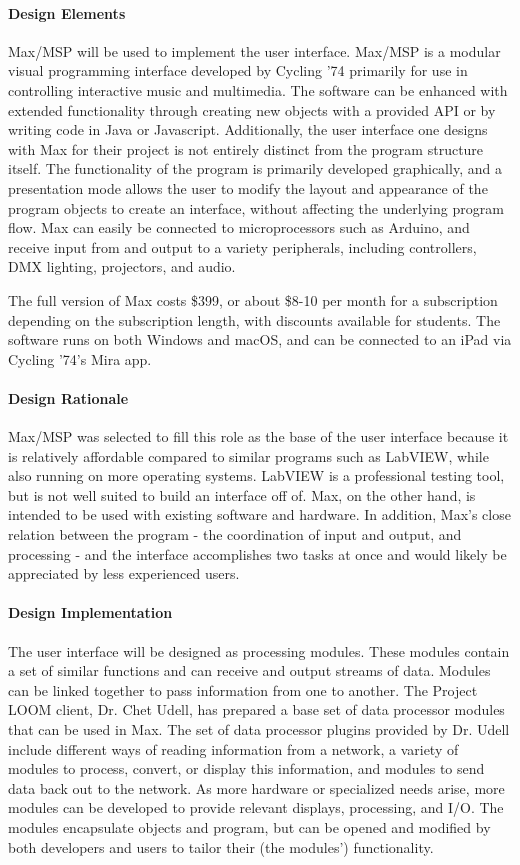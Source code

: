 \documentclass[onecolumn, draftclsnofoot,10pt, compsoc]{IEEEtran}
\begin{document}
\paragraph{Design Elements}
    Max/MSP will be used to implement the user interface. Max/MSP is a modular visual programming interface developed by Cycling '74 primarily for use in controlling interactive music and multimedia. The software can be enhanced with extended functionality through creating new objects with a provided API or by writing code in Java or Javascript. Additionally, the user interface one designs with Max for their project is not entirely distinct from the program structure itself. The functionality of the program is primarily developed graphically, and a presentation mode allows the user to modify the layout and appearance of the program objects to create an interface, without affecting the underlying program flow. Max can easily be connected to microprocessors such as Arduino, and receive input from and output to a variety peripherals, including controllers, DMX lighting, projectors, and audio. \cite{max}

    The full version of Max costs \$399, or about \$8-10 per month for a subscription depending on the subscription length, with discounts available for students. The software runs on both Windows and macOS, and can be connected to an iPad via Cycling '74's Mira app. \cite{buymax}

\paragraph{Design Rationale}
    Max/MSP was selected to fill this role as the base of the user interface because it is relatively affordable compared to similar programs such as LabVIEW, while also running on more operating systems. LabVIEW is a professional testing tool, but is not well suited to build an interface off of. Max, on the other hand, is intended to be used with existing software and hardware. In addition, Max's close relation between the program - the coordination of input and output, and processing - and the interface accomplishes two tasks at once and would likely be appreciated by less experienced users.

\paragraph{Design Implementation}
    The user interface will be designed as processing modules. These modules contain a set of similar functions and can receive and output streams of data. Modules can be linked together to pass information from one to another. The Project LOOM client, Dr. Chet Udell, has prepared a base set of data processor modules that can be used in Max. The set of data processor plugins provided by Dr. Udell include different ways of reading information from a network, a variety of modules to process, convert, or display this information, and modules to send data back out to the network. As more hardware or specialized needs arise, more modules can be developed to provide relevant displays, processing, and I/O. The modules encapsulate objects and program, but can be opened and modified by both developers and users to tailor their (the modules') functionality.
\end{document}
